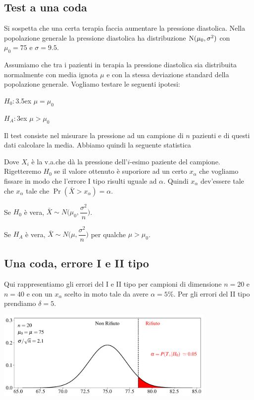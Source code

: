 \documentclass[11pt,openany]{book}
\begin{document}
\subsection{Test a una coda}
Si sospetta che una certa terapia faccia aumentare la pressione diastolica. Nella popolazione generale la pressione diastolica ha distribuzione ${\rm N}(\mu_0,\sigma^2)$ con $\mu_0=75$ e $\sigma=9.5$. 

Assumiamo che tra i pazienti in terapia la pressione diastolica sia distribuita normalmente con media ignota $\mu$ e con la stessa deviazione standard della popolazione generale. Vogliamo testare le seguenti ipotesi:

$H_0:$\kern3.5ex $\mu=\mu_0$

$H_A:$\kern3ex $\mu>\mu_0$

Il test consiste nel misurare la pressione ad un campione di $n$ pazienti e di questi dati calcolare la media. Abbiamo quindi la seguente statistica


Dove $X_i$ è la v.a.\@ che dà la pressione dell'$i$-esimo paziente del campione. Rigetteremo $H_0$ se il
valore ottenuto è suporiore ad un certo $x_\alpha$ che vogliamo fissare in modo che l'errore I tipo risulti uguale ad $\alpha$. Quindi $x_\alpha$ dev'essere tale che $x_\alpha$ tale che $\Pr(\bar X>x_\alpha)=\alpha$.

Se $H_0$ è vera, $\bar X\sim N\bigg(\mu_0,\dfrac{\sigma^2}{n}\bigg)$.

Se $H_A$ è vera, $\bar X\sim N\bigg(\mu,\dfrac{\sigma^2}{n}\bigg)$ per qualche $\mu>\mu_0$.

% 



\clearpage\subsection{Una coda, errore I e II tipo}


Qui rappresentiamo gli errori del I e II tipo per campioni di dimensione $n=20$ e $n= 40$ e con un $x_\alpha$ scelto in moto tale da avere $\alpha=5\%$. Per gli errori del II tipo prendiamo $\delta=5$.

\hfil\includegraphics[width=0.8\textwidth]{figure/Z-test_01.pdf}
\end{document}
